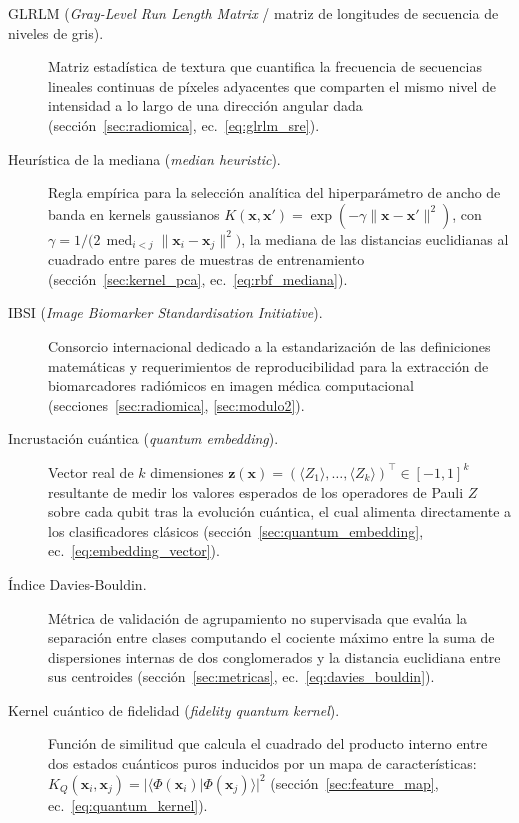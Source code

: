 \begin{description}
  \item[GLRLM (\textit{Gray-Level Run Length Matrix} / matriz de longitudes de secuencia de niveles de gris).] Matriz estadística de textura que cuantifica la frecuencia de secuencias lineales continuas de píxeles adyacentes que comparten el mismo nivel de intensidad a lo largo de una dirección angular dada (sección~\ref{sec:radiomica}, ec.~\ref{eq:glrlm_sre}).

  \item[Heurística de la mediana (\textit{median heuristic}).] Regla empírica para la selección analítica del hiperparámetro de ancho de banda en kernels gaussianos $K(\mathbf{x}, \mathbf{x}') = \exp(-\gamma \|\mathbf{x} - \mathbf{x}'\|^2)$, con $\gamma = 1/\bigl(2\,\operatorname{med}_{i<j}\lVert \mathbf{x}_i - \mathbf{x}_j \rVert^2\bigr)$, la mediana de las distancias euclidianas al cuadrado entre pares de muestras de entrenamiento (sección~\ref{sec:kernel_pca}, ec.~\ref{eq:rbf_mediana}).

  \item[IBSI (\textit{Image Biomarker Standardisation Initiative}).] Consorcio internacional dedicado a la estandarización de las definiciones matemáticas y requerimientos de reproducibilidad para la extracción de biomarcadores radiómicos en imagen médica computacional (secciones~\ref{sec:radiomica}, \ref{sec:modulo2}).

  \item[Incrustación cuántica (\textit{quantum embedding}).] Vector real de $k$ dimensiones $\mathbf{z}(\mathbf{x}) = (\langle Z_1 \rangle, \dots, \langle Z_k \rangle)^\top \in [-1, 1]^k$ resultante de medir los valores esperados de los operadores de Pauli $Z$ sobre cada qubit tras la evolución cuántica, el cual alimenta directamente a los clasificadores clásicos (sección~\ref{sec:quantum_embedding}, ec.~\ref{eq:embedding_vector}).

  \item[Índice Davies-Bouldin.] Métrica de validación de agrupamiento no supervisada que evalúa la separación entre clases computando el cociente máximo entre la suma de dispersiones internas de dos conglomerados y la distancia euclidiana entre sus centroides (sección~\ref{sec:metricas}, ec.~\ref{eq:davies_bouldin}).

  \item[Kernel cuántico de fidelidad (\textit{fidelity quantum kernel}).] Función de similitud que calcula el cuadrado del producto interno entre dos estados cuánticos puros inducidos por un mapa de características: $K_Q(\mathbf{x}_i, \mathbf{x}_j) = |\langle \Phi(\mathbf{x}_i)|\Phi(\mathbf{x}_j)\rangle|^2$ (sección~\ref{sec:feature_map}, ec.~\ref{eq:quantum_kernel}).


\end{description}
